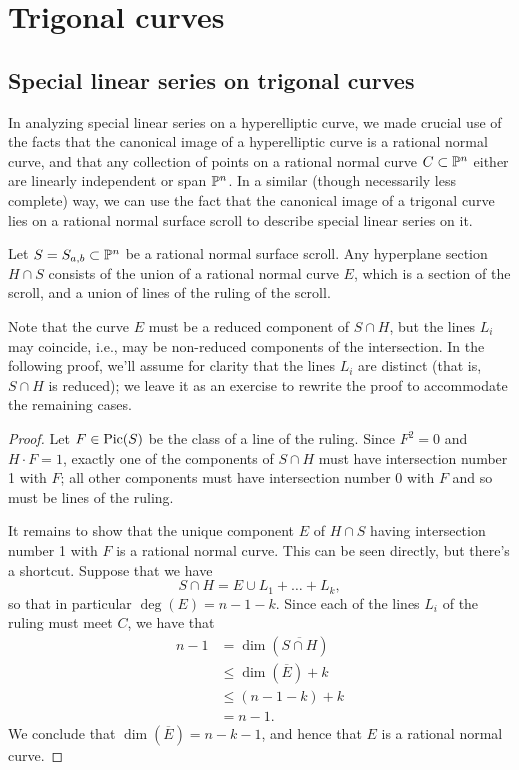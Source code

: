 \section{Trigonal curves}

\subsection{Special linear series on trigonal curves}

In analyzing special linear series on a hyperelliptic curve, we made crucial use of the facts that the canonical image of a hyperelliptic curve is a rational normal curve, and that any collection of points on a rational normal curve $C \subset {\mathbb P}^n$ either are linearly independent or span ${\mathbb P}^n$. In a similar (though necessarily less complete) way, we can use the fact that the canonical image of a trigonal curve lies on a rational normal surface scroll to describe special linear series on it.

 

\begin{lemma}
Let $S = S_{a,b} \subset {\mathbb P}^n$ be a rational normal surface scroll. Any hyperplane section $H \cap S$ consists of the union of a rational normal curve $E$, which is a section of the scroll, and a union of lines of the ruling of the scroll.
\end{lemma}

Note that the curve $E$ must be a reduced component of $S \cap H$, but the lines $L_i$ may coincide, i.e., may be non-reduced components of the intersection. In the following proof, we'll assume for clarity that the lines $L_i$ are distinct (that is, $S \cap H$ is reduced); we leave it as an exercise to rewrite the proof to accommodate the remaining cases.

\begin{proof}
Let $F \in \operatorname{Pic}(S)$ be the class of a line of the ruling. Since $F^2 = 0$ and $H\cdot F = 1$, exactly one of the components of $S \cap H$ must have intersection number 1 with $F$; all other components must have intersection number 0 with $F$ and so must be lines of the ruling.

It remains to show that the unique component $E$ of $H \cap S$ having intersection number 1 with $F$ is a rational normal curve. This can be seen directly, but there's a shortcut. Suppose that we have
$$
S \cap H = E \cup L_1 + \dots + L_k,
$$
so that in particular $\deg(E) = n-1-k$. Since each of the lines $L_i$ of the ruling must meet $C$, we have that
\begin{align*}
n-1 &= \dim(\overline{S \cap H}) \\
&\leq \dim(\overline {E}) + k\\
&\leq (n-1-k) + k \\
&= n-1.
\end{align*}
We conclude that $\dim(\overline E) = n-k-1$, and hence that $E$ is a rational normal curve.
\end{proof}

